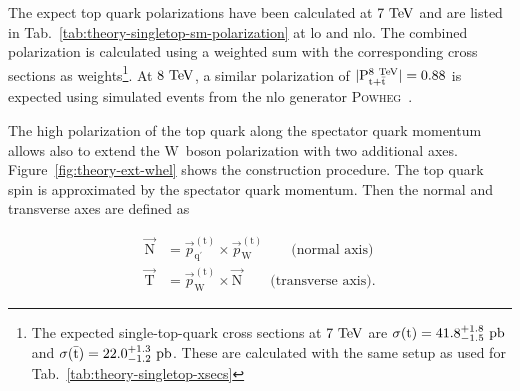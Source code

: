 The expect top quark polarizations have been calculated at $7~\mathrm{TeV}$ and are listed in Tab.~\ref{tab:theory-singletop-sm-polarization} at \gls{lo} and \gls{nlo}. The combined polarization is calculated using a weighted sum with the corresponding cross sections as weights\footnote{The expected single-top-quark cross sections at $7~\mathrm{TeV}$ are $\sigma(\mathrm{t})=41.8^{+1.8}_{-1.5}~\mathrm{pb}$ and $\sigma(\bar{\mathrm{t}})=22.0^{+1.3}_{-1.2}~\mathrm{pb}$. These are calculated with the same setup as used for Tab.~\ref{tab:theory-singletop-xsecs}}. At $8~\mathrm{TeV}$, a similar polarization of $|\mathrm{P}_{\mathrm{t}+\bar{\mathrm{t}}}^\mathrm{8~\mathrm{TeV}}|=0.88$ is expected using simulated events from the \gls{nlo} generator \textsc{Powheg}~\cite{Khachatryan:2015dzz}.


The high polarization of the top quark along the spectator quark momentum allows also to extend the $\mathrm{W}$~boson polarization with two additional axes. Figure~\ref{fig:theory-ext-whel} shows the construction procedure. The top quark spin is approximated by the spectator quark momentum. Then the normal and transverse axes are defined as 

\begin{align}
\vec{\mathrm{N}}&=\vec{p}_{\mathrm{q}^\prime}^{\mathrm{(t)}}\times\vec{p}_{\mathrm{W}}^{\mathrm{(t)}}\qquad\text{(normal axis)} \\
\vec{\mathrm{T}}&=\vec{p}_{\mathrm{W}}^{\mathrm{(t)}}\times \vec{\mathrm{N}}\qquad\text{(transverse axis)}.
\end{align}

